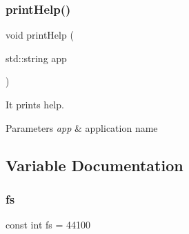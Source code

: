 \mbox{\label{main_8cpp_a93ca5b3dfa32956bb4767126ef1e85bd}} 
\subsubsection{print\+Help()}
{\footnotesize\ttfamily void print\+Help (\begin{DoxyParamCaption}\item[{std\+::string}]{app }\end{DoxyParamCaption})}



It prints help. 


\begin{DoxyParams}{Parameters}
{\em app} & application name \\
\hline
\end{DoxyParams}


\subsection{Variable Documentation}
\mbox{\label{main_8cpp_ae0364c1e67427dc2138fe1fa997f6829}} 
\subsubsection{fs}
{\footnotesize\ttfamily const int fs = 44100}

